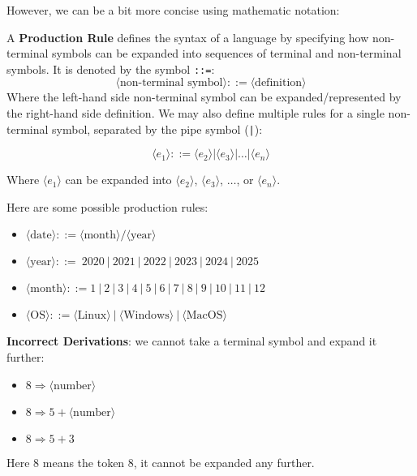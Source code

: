 \newpage

However, we can be a bit more concise using mathematic notation:

\begin{Def}[Production Rule (\texttt{::=})]
    
    A \textbf{Production Rule} defines the syntax of a language by specifying how non-terminal symbols can be expanded into
    sequences of terminal and non-terminal symbols. It is denoted by the symbol \texttt{::=}:
    \[
    \langle \text{non-terminal symbol} \rangle ::= \langle \text{definition} \rangle
    \]
    Where the left-hand side non-terminal symbol can be expanded/represented by the right-hand side definition.
    We may also define multiple rules for a single non-terminal symbol, separated by the pipe symbol (\texttt{|}):

    \[
    \langle e_1 \rangle ::= \langle e_2 \rangle | \langle e_3 \rangle | \dots | \langle e_n \rangle
    \]

    Where $\langle e_1 \rangle$ can be expanded into $\langle e_2 \rangle$, $\langle e_3 \rangle$, $\dots$, or $\langle e_n \rangle$. 
\end{Def}

\begin{Example}

    Here are some possible production rules:
    \begin{itemize}
        
        \item $\langle \text{date} \rangle ::= \langle \text{month} \rangle / \langle \text{year} \rangle$
        \item $\langle \text{year} \rangle ::=  \ 2020 \ | \ 2021 \ | \ 2022 \ | \ 2023 \ | \ 2024 \ | \ 2025$
        \item $\langle \text{month} \rangle ::= 1 \ | \ 2 \ | \ 3 \ | \ 4 \ | \ 5 \ | \ 6 \ | \ 7 \ | \ 8 \ | \ 9 \ | \ 10 \ | \ 11 \ | \ 12$
        
        \item $\langle \text{OS} \rangle ::= \langle \text{Linux} \rangle \ | \ \langle \text{Windows} \rangle \ | \ \langle \text{MacOS} \rangle$
    \end{itemize}

    \noindent
    \textbf{Incorrect Derivations}: we cannot take a terminal symbol and expand it further:
    \begin{itemize}
        \item $8 \Rightarrow \langle \text{number} \rangle$ 
        \item $8 \Rightarrow 5 + \langle \text{number} \rangle$
        \item $8 \Rightarrow 5 + 3$
    \end{itemize}

    \noindent
    Here $8$ means the token $8$, it cannot be expanded any further.
\end{Example}

